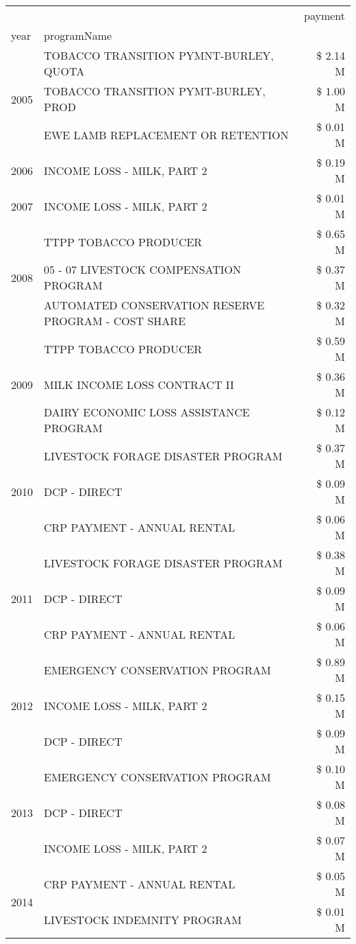 \begin{tabular}{llr}
\toprule
 &  & payment \\
year & programName &  \\
\midrule
\multirow[t]{3}{*}{2005} & TOBACCO TRANSITION PYMNT-BURLEY, QUOTA & \$ 2.14 M \\
 & TOBACCO TRANSITION PYMT-BURLEY, PROD & \$ 1.00 M \\
 & EWE LAMB REPLACEMENT OR RETENTION & \$ 0.01 M \\
\cline{1-3}
2006 & INCOME LOSS - MILK, PART 2 & \$ 0.19 M \\
\cline{1-3}
2007 & INCOME LOSS - MILK, PART 2 & \$ 0.01 M \\
\cline{1-3}
\multirow[t]{3}{*}{2008} & TTPP TOBACCO PRODUCER & \$ 0.65 M \\
 & 05 - 07 LIVESTOCK COMPENSATION PROGRAM & \$ 0.37 M \\
 & AUTOMATED CONSERVATION RESERVE PROGRAM - COST SHARE & \$ 0.32 M \\
\cline{1-3}
\multirow[t]{3}{*}{2009} & TTPP TOBACCO PRODUCER & \$ 0.59 M \\
 & MILK INCOME LOSS CONTRACT II & \$ 0.36 M \\
 & DAIRY ECONOMIC LOSS ASSISTANCE PROGRAM & \$ 0.12 M \\
\cline{1-3}
\multirow[t]{3}{*}{2010} & LIVESTOCK FORAGE DISASTER PROGRAM & \$ 0.37 M \\
 & DCP - DIRECT & \$ 0.09 M \\
 & CRP PAYMENT - ANNUAL RENTAL & \$ 0.06 M \\
\cline{1-3}
\multirow[t]{3}{*}{2011} & LIVESTOCK FORAGE DISASTER PROGRAM & \$ 0.38 M \\
 & DCP - DIRECT & \$ 0.09 M \\
 & CRP PAYMENT - ANNUAL RENTAL & \$ 0.06 M \\
\cline{1-3}
\multirow[t]{3}{*}{2012} & EMERGENCY CONSERVATION PROGRAM & \$ 0.89 M \\
 & INCOME LOSS - MILK, PART 2 & \$ 0.15 M \\
 & DCP - DIRECT & \$ 0.09 M \\
\cline{1-3}
\multirow[t]{3}{*}{2013} & EMERGENCY CONSERVATION PROGRAM & \$ 0.10 M \\
 & DCP - DIRECT & \$ 0.08 M \\
 & INCOME LOSS - MILK, PART 2 & \$ 0.07 M \\
\cline{1-3}
\multirow[t]{3}{*}{2014} & CRP PAYMENT - ANNUAL RENTAL & \$ 0.05 M \\
 & LIVESTOCK INDEMNITY PROGRAM & \$ 0.01 M \\

\end{tabular}
